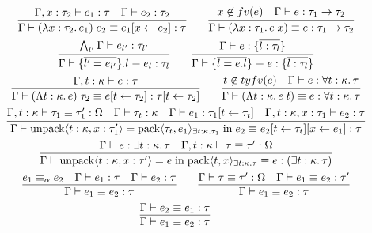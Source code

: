\begin{gather*}
  \infer{\Gamma \vdash (\lambda x: \tau_2\ldotp e_1)\; e_2 \equiv e_1[x \assign e_2]: \tau}{
    \Gamma, x: \tau_2 \vdash e_1: \tau
    &
    \Gamma \vdash e_2: \tau_2
  }
  \hspace{2em}
  \infer{\Gamma \vdash (\lambda x: \tau_1\ldotp e\; x) \equiv e: \tau_1 \to \tau_2}{
    x \not\in \freevar(e)
    &
    \Gamma \vdash e: \tau_1 \to \tau_2
  }
  \\
  \infer{\Gamma \vdash \{\overline{l' = e_{l'}}\}.l \equiv e_l: \tau_l}{
    \bigwedge_{l'} \Gamma \vdash e_{l'}: \tau_{l'}
  }
  \hspace{2em}
  \infer{\Gamma \vdash \{\overline{l = e.l}\} \equiv e: \{\overline{l: \tau_l}\}}{
    \Gamma \vdash e: \{\overline{l: \tau_l}\}
  }
  \\
  \infer{\Gamma \vdash (\Lambda t: \kappa\ldotp e)\; \tau_2 \equiv e[t \assign \tau_2]: \tau[t \assign \tau_2]}{
    \Gamma, t: \kappa \vdash e: \tau
  }
  \hspace{2em}
  \infer{\Gamma \vdash (\Lambda t: \kappa\ldotp e\; t) \equiv e: \forall t: \kappa\ldotp \tau}{
    t \not\in \typefreevar(e)
    &
    \Gamma \vdash e: \forall t: \kappa\ldotp \tau
  }
  \\
  \infer{\Gamma \vdash \symunpack\langle t: \kappa, x: \tau'_1\rangle = \sympack\langle \tau_t, e_1\rangle_{\exists t: \kappa\ldotp \tau_1} \symin e_2 \equiv e_2[t \assign \tau_t][x \assign e_1]: \tau}{
    \Gamma, t: \kappa \vdash \tau_1 \equiv \tau'_1: \Omega
    &
    \Gamma \vdash \tau_t: \kappa
    &
    \Gamma \vdash e_1: \tau_1[t \assign \tau_t]
    &
    \Gamma, t: \kappa, x: \tau_1 \vdash e_2: \tau
  }
  \\
  \infer{\Gamma \vdash \symunpack\langle t: \kappa, x: \tau'\rangle = e \symin \sympack\langle t, x\rangle_{\exists t: \kappa\ldotp \tau} \equiv e: (\exists t: \kappa\ldotp \tau)}{
    \Gamma \vdash e: \exists t: \kappa\ldotp \tau
    &
    \Gamma, t: \kappa \vdash \tau \equiv \tau': \Omega
  }
  \\
  \infer{\Gamma \vdash e_1 \equiv e_2: \tau}{
    e_1 \equiv_\alpha e_2
    &
    \Gamma \vdash e_1: \tau
    &
    \Gamma \vdash e_2: \tau
  }
  \hspace{2em}
  \infer{\Gamma \vdash e_1 \equiv e_2: \tau}{
    \Gamma \vdash \tau \equiv \tau': \Omega
    &
    \Gamma \vdash e_1 \equiv e_2: \tau'
  }
  \\
  \infer{\Gamma \vdash e_1 \equiv e_2: \tau}{
    \Gamma \vdash e_2 \equiv e_1: \tau
  }
  \hspace{2em}

\end{gather*}
